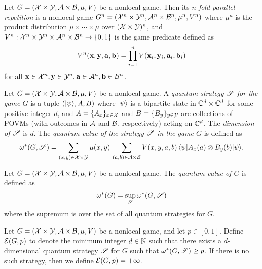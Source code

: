 \begin{definition}
Let $G = (\mathcal{X} \times \mathcal{Y},\mathcal{A} \times \mathcal{B},\mu,V)$ be a nonlocal game. Then its \emph{$n$-fold parallel repetition} is a nonlocal game $G^n = (\mathcal{X}^n \times \mathcal{Y}^n, \mathcal{A}^n \times \mathcal{B}^n,\mu^n,V^n)$ where $\mu^n$ is the product distribution $\mu \times \cdots \times \mu$ over $(\mathcal{X} \times \mathcal{Y})^n$, and $V^n: \mathcal{X}^n \times \mathcal{Y}^n \times \mathcal{A}^n \times \mathcal{B}^n \to \{0,1\}$ is the game predicate defined as
\[
	V^n(\mathbf{x},\mathbf{y},\mathbf{a},\mathbf{b}) = \prod_{i=1}^n V(\mathbf{x}_i,\mathbf{y}_i,\mathbf{a}_i,\mathbf{b}_i)
\]
for all $\mathbf{x} \in \mathcal{X}^n,\mathbf{y} \in \mathcal{Y}^n,\mathbf{a} \in \mathcal{A}^n,\mathbf{b} \in \mathcal{B}^n$.
\end{definition}

\begin{definition}
Let $G = (\mathcal{X} \times \mathcal{Y},\mathcal{A} \times \mathcal{B},\mu,V)$ be a nonlocal game. A \emph{quantum strategy $\mathscr{S}$ for the game $G$} is a tuple $({|\psi\rangle}, A,B)$ where ${|\psi\rangle}$ is a bipartite state in $\mathbb{C}^d \times \mathbb{C}^d$ for some positive integer $d$, and $A = \{ A_x \}_{x \in \mathcal{X}}$ and $B = \{B_y\}_{y \in \mathcal{Y}}$ are collections of POVMs (with outcomes in $\mathcal{A}$ and $\mathcal{B}$, respectively) acting on $\mathbb{C}^d$. The \emph{dimension of $\mathscr{S}$} is $d$. The \emph{quantum value of the strategy $\mathscr{S}$ in the game $G$} is defined as
\[
	\omega^*(G,\mathscr{S}) = \sum_{(x,y) \in \mathcal{X} \times \mathcal{Y}} \mu(x,y) \,  \sum_{(a,b) \in \mathcal{A} \times \mathcal{B}} V(x,y,a,b) \, {\langle\psi|} A_x(a) \otimes B_y(b) {|\psi\rangle}.
\]
\end{definition}

\begin{definition}
Let $G = (\mathcal{X} \times \mathcal{Y},\mathcal{A} \times \mathcal{B},\mu,V)$ be a nonlocal game. The \emph{quantum value of $G$} is defined as
\[
	\omega^*(G) = \sup_{\mathscr{S}} \omega^*(G,\mathscr{S})
\]
where the supremum is over the set of all quantum strategies for $G$.
\end{definition}

\begin{definition}
Let $G = (\mathcal{X} \times \mathcal{Y},\mathcal{A} \times \mathcal{B},\mu,V)$ be a nonlocal game, and let $p \in [0,1]$. Define $\mathcal{E}(G,p)$ to denote the minimum integer $d \in \mathbb{N}$ such that there exists a $d$-dimensional quantum strategy $\mathscr{S}$ for $G$ such that $\omega^*(G,\mathscr{S}) \geq p$. If there is no such strategy, then we define $\mathcal{E}(G,p) = +\infty$.
\end{definition}


